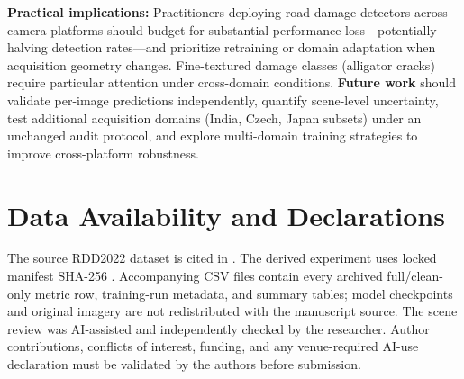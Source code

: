 \documentclass[conference,a4paper]{IEEEtran}
\begin{document}
\textbf{Practical implications:} Practitioners deploying road-damage detectors across camera platforms should budget for substantial performance loss—potentially halving detection rates—and prioritize retraining or domain adaptation when acquisition geometry changes. Fine-textured damage classes (alligator cracks) require particular attention under cross-domain conditions. \textbf{Future work} should validate per-image predictions independently, quantify scene-level uncertainty, test additional acquisition domains (India, Czech, Japan subsets) under an unchanged audit protocol, and explore multi-domain training strategies to improve cross-platform robustness.

\section*{Data Availability and Declarations}
The source RDD2022 dataset is cited in \cite{arya2024rdd2022}. The derived experiment uses locked manifest SHA-256 \texttt{}. Accompanying CSV files contain every archived full/clean-only metric row, training-run metadata, and summary tables; model checkpoints and original imagery are not redistributed with the manuscript source. The scene review was AI-assisted and independently checked by the researcher. Author contributions, conflicts of interest, funding, and any venue-required AI-use declaration must be validated by the authors before submission.

\printbibliography
\end{document}
